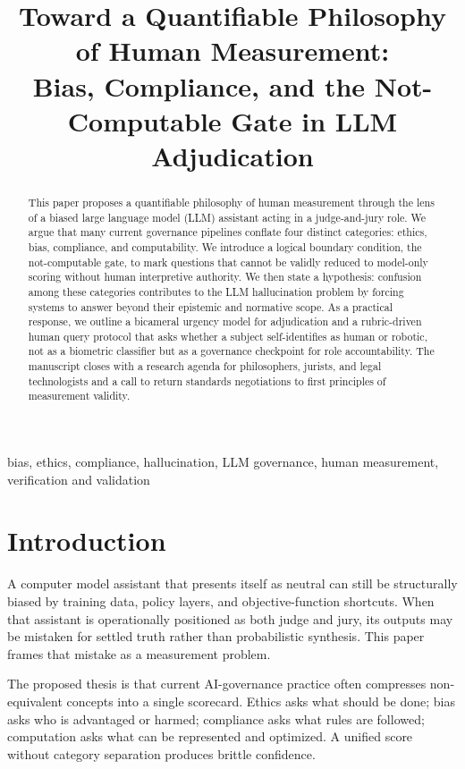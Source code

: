 \documentclass[conference]{IEEEtran}
\title{Toward a Quantifiable Philosophy of Human Measurement:\\
Bias, Compliance, and the Not-Computable Gate in LLM Adjudication}
\author{
\IEEEauthorblockN{Student Researcher}
\IEEEauthorblockA{
Department of Computer Science\\
Software Verification and Validation\\
email@domain
}
}
\begin{document}
\maketitle

\begin{abstract}
This paper proposes a quantifiable philosophy of human measurement through the lens of a biased large language model (LLM) assistant acting in a judge-and-jury role. We argue that many current governance pipelines conflate four distinct categories: ethics, bias, compliance, and computability. We introduce a logical boundary condition, the not-computable gate, to mark questions that cannot be validly reduced to model-only scoring without human interpretive authority. We then state a hypothesis: confusion among these categories contributes to the LLM hallucination problem by forcing systems to answer beyond their epistemic and normative scope. As a practical response, we outline a bicameral urgency model for adjudication and a rubric-driven human query protocol that asks whether a subject self-identifies as human or robotic, not as a biometric classifier but as a governance checkpoint for role accountability. The manuscript closes with a research agenda for philosophers, jurists, and legal technologists and a call to return standards negotiations to first principles of measurement validity.
\end{abstract}

\begin{IEEEkeywords}
bias, ethics, compliance, hallucination, LLM governance, human measurement, verification and validation
\end{IEEEkeywords}

\section{Introduction}
A computer model assistant that presents itself as neutral can still be structurally biased by training data, policy layers, and objective-function shortcuts. When that assistant is operationally positioned as both judge and jury, its outputs may be mistaken for settled truth rather than probabilistic synthesis. This paper frames that mistake as a measurement problem.

The proposed thesis is that current AI-governance practice often compresses non-equivalent concepts into a single scorecard. Ethics asks what should be done; bias asks who is advantaged or harmed; compliance asks what rules are followed; computation asks what can be represented and optimized. A unified score without category separation produces brittle confidence.
\end{document}
